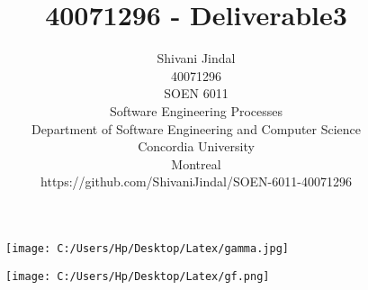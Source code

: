 \documentclass[10pt]{article}
\begin{document}
\title{40071296 - Deliverable3}

\LARGE{\author{
	Shivani Jindal \\
	40071296\\
	SOEN 6011\\
	Software Engineering Processes\\
	Department of Software Engineering and Computer Science\\
	Concordia University\\
	Montreal\\
https://github.com/ShivaniJindal/SOEN-6011-40071296 }}
\maketitle

\begin{figure} [h]
	\centering
	\texttt{[image: C:/Users/Hp/Desktop/Latex/gamma.jpg]}
\end{figure}

\begin{figure}[h]
	\centering
	\texttt{[image: C:/Users/Hp/Desktop/Latex/gf.png]}
\end{figure}

\onehalfspacing  
\newpage
\end{document}
